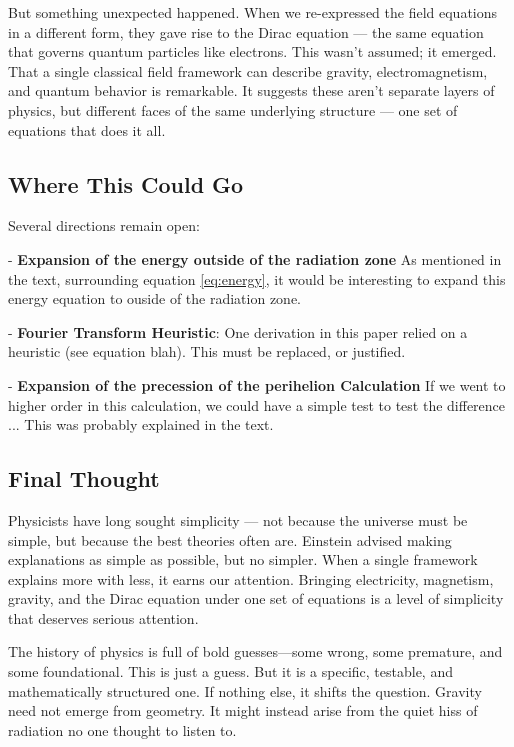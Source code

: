 \documentclass {article}
\begin{document}
But something unexpected happened. When we re-expressed the field equations in a different form, they gave rise to the Dirac equation — the same equation that governs quantum particles like electrons. This wasn’t assumed; it emerged. That a single classical field framework can describe gravity, electromagnetism, and quantum behavior is remarkable. It suggests these aren’t separate layers of physics, but different faces of the same underlying structure — one set of equations that does it all.


\subsection{Where This Could Go}

Several directions remain open:

- \textbf{Expansion of the energy outside of the radiation zone} As mentioned in the text, surrounding equation \ref{eq:energy}, it would be interesting to expand this energy equation to ouside of the radiation zone.

- \textbf{Fourier Transform Heuristic}: One derivation in this paper relied on a heuristic (see equation blah). This must be replaced, or justified.

- \textbf{Expansion of the precession of the perihelion Calculation} If we went to higher order in this calculation, we could have a simple test to test the difference ... This was probably explained in the text.


\subsection{Final Thought}

Physicists have long sought simplicity — not because the universe must be simple, but because the best theories often are. Einstein advised making explanations as simple as possible, but no simpler. When a single framework explains more with less, it earns our attention. Bringing electricity, magnetism, gravity, and the Dirac equation under one set of equations is a level of simplicity that deserves serious attention.

The history of physics is full of bold guesses—some wrong, some premature, and some foundational. This is just a guess. But it is a specific, testable, and mathematically structured one. If nothing else, it shifts the question. Gravity need not emerge from geometry. It might instead arise from the quiet hiss of radiation no one thought to listen to.
\end{document}

